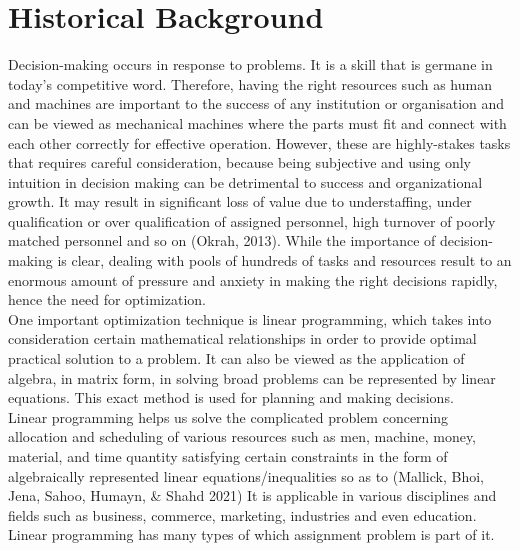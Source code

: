 \documentclass[11pt]{report}
\newcommand{\NI}{\noindent}
\begin{document}
	\section{Historical Background}
	Decision-making occurs in response to problems. It is a skill that is germane in today's competitive word. Therefore, having the right resources such as human and machines are important to the success of any institution or organisation and can be viewed as mechanical machines where the parts must fit and connect with each other correctly for effective operation. However, these are highly-stakes tasks that requires careful consideration, because being subjective and using only intuition in decision making can be detrimental to success and organizational growth. It may result in significant loss of value due to understaffing, under qualification or over qualification of assigned personnel, high turnover of poorly matched personnel and so on (Okrah, 2013). While the importance of decision-making is clear, dealing with pools of hundreds of tasks and resources result to an enormous amount of pressure and anxiety in making the right decisions rapidly, hence the need for optimization.\\
	
	\NI One important optimization technique is linear programming, which takes into consideration certain mathematical relationships in order to provide optimal practical solution to a problem. It can also be viewed as the application of algebra, in matrix form, in solving broad problems can be represented by linear equations. This exact method is used for planning and making decisions.\\
	
	\NI Linear programming helps us solve the complicated problem concerning allocation and scheduling of various resources such as men, machine, money, material, and time quantity satisfying certain constraints in the form of algebraically represented linear equations/inequalities so as to (Mallick, Bhoi, Jena, Sahoo, Humayn, \& Shahd 2021) It is applicable in various disciplines and fields such as business, commerce, marketing, industries and even education. Linear programming has many types of which assignment problem is part of it.\\
	
\end{document}
